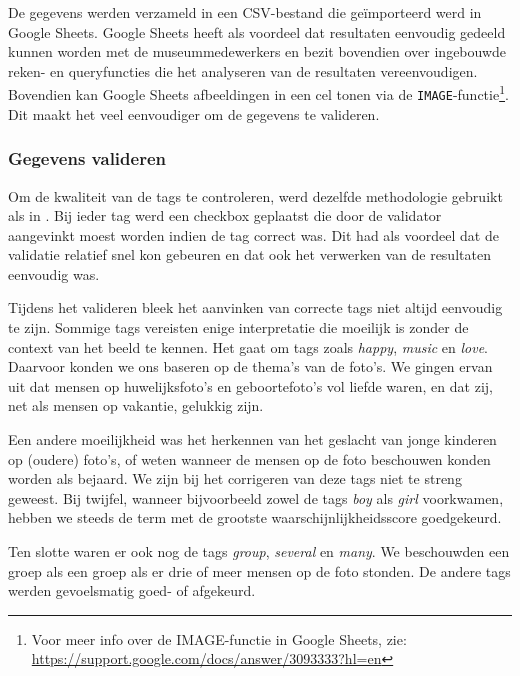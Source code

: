 De gegevens werden verzameld in een CSV-bestand die geïmporteerd werd in Google Sheets. Google Sheets heeft als voordeel dat resultaten eenvoudig gedeeld kunnen worden met de museummedewerkers en bezit bovendien over ingebouwde reken- en queryfuncties die het analyseren van de resultaten vereenvoudigen. Bovendien kan Google Sheets afbeeldingen in een cel tonen via de \texttt{IMAGE}-functie\footnote{Voor meer info over de IMAGE-functie in Google Sheets, zie: \url{https://support.google.com/docs/answer/3093333?hl=en}}. Dit maakt het veel eenvoudiger om de gegevens te valideren.


\subsubsection{Gegevens valideren}
\label{subsubsec:gegevens-valideren}

Om de kwaliteit van de tags te controleren, werd dezelfde methodologie gebruikt als in \textcite{Vanstappen2019}. Bij ieder tag werd een checkbox geplaatst die door de validator aangevinkt moest worden indien de tag correct was. Dit had als voordeel dat de validatie relatief snel kon gebeuren en dat ook het verwerken van de resultaten eenvoudig was. 

Tijdens het valideren bleek het aanvinken van correcte tags niet altijd eenvoudig te zijn. Sommige tags vereisten enige interpretatie die moeilijk is zonder de context van het beeld te kennen. Het gaat om tags zoals \textit{happy}, \textit{music} en \textit{love}. Daarvoor konden we ons baseren op de thema’s van de foto’s. We gingen ervan uit dat mensen op huwelijksfoto’s en geboortefoto’s vol liefde waren, en dat zij, net als mensen op vakantie, gelukkig zijn. 

Een andere moeilijkheid was het herkennen van het geslacht van jonge kinderen op (oudere) foto's, of weten wanneer de mensen op de foto beschouwen konden worden als bejaard. We zijn bij het corrigeren van deze tags niet te streng geweest. Bij twijfel, wanneer bijvoorbeeld zowel de tags \textit{boy} als \textit{girl} voorkwamen, hebben we steeds de term met de grootste waarschijnlijkheidsscore goedgekeurd.

Ten slotte waren er ook nog de tags \textit{group}, \textit{several} en \textit{many}. We beschouwden een groep als een groep als er drie of meer mensen op de foto stonden. De andere tags werden gevoelsmatig goed- of afgekeurd.

